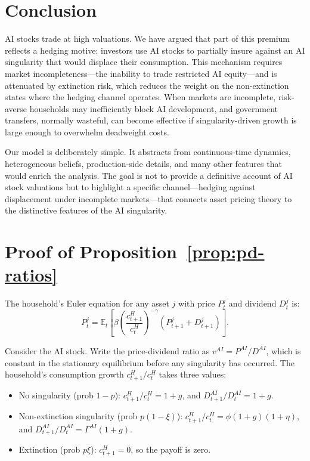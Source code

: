 \documentclass[12pt]{article}
\begin{document}
\section{Conclusion} \label{sec:conclusion} %

AI stocks trade at high valuations. We have argued that part of this premium reflects a hedging motive: investors use AI stocks to partially insure against an AI singularity that would displace their consumption. This mechanism requires market incompleteness---the inability to trade restricted AI equity---and is attenuated by extinction risk, which reduces the weight on the non-extinction states where the hedging channel operates. When markets are incomplete, risk-averse households may inefficiently block AI development, and government transfers, normally wasteful, can become effective if singularity-driven growth is large enough to overwhelm deadweight costs.

Our model is deliberately simple. It abstracts from continuous-time dynamics, heterogeneous beliefs, production-side details, and many other features that would enrich the analysis. The goal is not to provide a definitive account of AI stock valuations but to highlight a specific channel---hedging against displacement under incomplete markets---that connects asset pricing theory to the distinctive features of the AI singularity.

\appendix

\section{Proof of Proposition~\ref{prop:pd-ratios}} \label{app:proof-pd} %

The household's Euler equation for any asset $j$ with price $P_t^j$ and dividend $D_t^j$ is:
%
\begin{equation}
P_t^j = \mathbb{E}_t \left[ \beta \left( \frac{c_{t+1}^H}{c_t^H} \right)^{-\gamma} (P_{t+1}^j + D_{t+1}^j) \right]. \label{eq:euler}
\end{equation}

Consider the AI stock. Write the price-dividend ratio as $v^{AI} = P^{AI}/D^{AI}$, which is constant in the stationary equilibrium before any singularity has occurred. The household's consumption growth $c_{t+1}^H / c_t^H$ takes three values:
%
\begin{itemize}
\item No singularity (prob $1-p$): $c_{t+1}^H / c_t^H = 1+g$, and $D_{t+1}^{AI}/D_t^{AI} = 1+g$.
\item Non-extinction singularity (prob $p(1-\xi)$): $c_{t+1}^H / c_t^H = \phi(1+g)(1+\eta)$, and $D_{t+1}^{AI}/D_t^{AI} = \Gamma^{AI} (1+g)$.
\item Extinction (prob $p\xi$): $c_{t+1}^H = 0$, so the payoff is zero.
\end{itemize}
\end{document}
